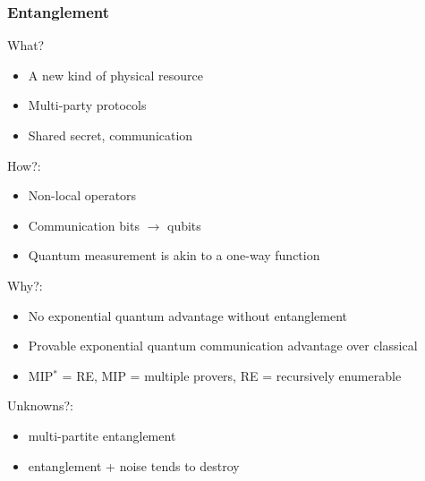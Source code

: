 \subsubsection{Entanglement}
What?
\begin{itemize}
    \item A new kind of physical resource
    \item Multi-party protocols
    \item Shared secret, communication
\end{itemize}
How?:
\begin{itemize}
    \item Non-local operators
    \item Communication bits $\rightarrow$ qubits
    \item Quantum measurement is akin to a one-way function
\end{itemize}
Why?:
\begin{itemize}
    \item No exponential quantum advantage without entanglement
    \item Provable exponential quantum communication advantage over classical 
    \item MIP$^{*}$ = RE, MIP = multiple provers, RE = recursively enumerable 
\end{itemize}
Unknowns?:
\begin{itemize}
    \item multi-partite entanglement
    \item entanglement + noise tends to destroy
\end{itemize}


